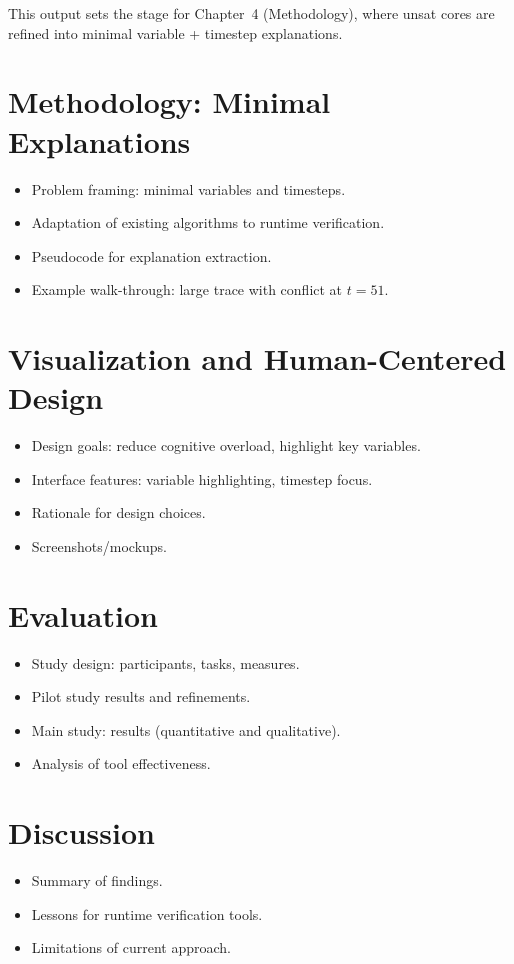 \documentclass[12pt]{report}
\begin{document}
This output sets the stage for Chapter~4 (Methodology), where unsat cores are refined into minimal variable + timestep explanations.


\chapter{Methodology: Minimal Explanations}
\begin{itemize}
  \item Problem framing: minimal variables and timesteps.
  \item Adaptation of existing algorithms to runtime verification.
  \item Pseudocode for explanation extraction.
  \item Example walk-through: large trace with conflict at $t=51$.
\end{itemize}

\chapter{Visualization and Human-Centered Design}
\begin{itemize}
  \item Design goals: reduce cognitive overload, highlight key variables.
  \item Interface features: variable highlighting, timestep focus.
  \item Rationale for design choices.
  \item Screenshots/mockups.
\end{itemize}

\chapter{Evaluation}
\begin{itemize}
  \item Study design: participants, tasks, measures.
  \item Pilot study results and refinements.
  \item Main study: results (quantitative and qualitative).
  \item Analysis of tool effectiveness.
\end{itemize}

\chapter{Discussion}
\begin{itemize}
  \item Summary of findings.
  \item Lessons for runtime verification tools.
  \item Limitations of current approach.
\end{itemize}
\end{document}
